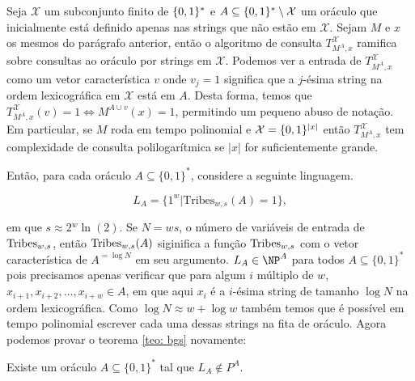 Seja $\mathcal{X}$ um subconjunto finito de $\{0, 1\}^{*}$ e $A \subseteq \{0, 1\}^{*} \setminus \mathcal{X}$ um oráculo que inicialmente está definido apenas nas strings que não estão em $\mathcal{X}$. Sejam $M$ e $x$ os mesmos do parágrafo anterior, então o algoritmo de consulta $T_{M^{A}, x}^{\mathcal{X}}$ ramifica sobre consultas ao oráculo por strings em $\mathcal{X}$. Podemos ver a entrada de $T_{M^{A}, x}^{\mathcal{X}}$ como um vetor característica $v$ onde $v_{j} = 1$ significa que a $j$-ésima string na ordem lexicográfica em $\mathcal{X}$ está em $A$. Desta forma, temos que $T_{M^{A}, x}^{\mathcal{X}}(v) = 1 \iff M^{A \cup v}(x) = 1$, permitindo um pequeno abuso de notação. Em particular, se $M$ roda em tempo polinomial e $\mathcal{X} = \{0, 1\}^{\lvert x \rvert}$ então $T_{M^{A}, x}^{\mathcal{X}}$ tem complexidade de consulta polilogarítmica se $\lvert x \rvert$ for suficientemente grande.

Então, para cada oráculo $A \subseteq \{0, 1\}^{*}$, considere a seguinte linguagem.

\begin{equation*}
L_{A} = \{1^{w} \lvert \text{Tribes}_{w, s}(A) = 1\},
\end{equation*}

em que $s \approx 2{^w}\ln(2)$. Se $N = ws$, o número de variáveis de entrada de $\text{Tribes}_{w, s}$, então $\text{Tribes}_{w, s}(A)$ siginifica a função $\text{Tribes}_{w, s}$ com o vetor característica de $A^{= \log N}$ em seu argumento. $L_{A} \in \NP^{A}$ para todos $A \subseteq \{0, 1\}^{*}$ pois precisamos apenas verificar que para algum $i$ múltiplo de $w$, $x_{i + 1}, x_{i + 2}, \dots, x_{i + w} \in A$, em que aqui $x_{i}$ é a $i$-ésima string de tamanho $\log N$ na ordem lexicográfica. Como $\log N \approx w + \log w$ também temos que é possível em tempo polinomial escrever cada uma dessas strings na fita de oráculo. Agora podemos provar o teorema \ref{teo: bgs} novamente:

\begin{prop} \label{prop: p_vs_np_r}

Existe um oráculo $A \subseteq \{0, 1\}^{*}$ tal que $L_{A} \notin P^{A}$.

\end{prop}

